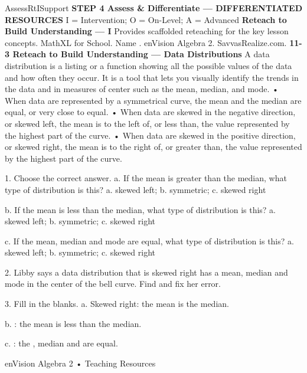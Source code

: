 \documentclass{article}
\newenvironment{te-addendum}[2]{}{}     %
\newcommand{\answer}[1]{}               %
\newcommand{\placeholder}[2]{}          %
\begin{document}
\begin{te-addendum}{Assess}{RtISupport}
\textbf{STEP 4 Assess & Differentiate — DIFFERENTIATED RESOURCES}
I = Intervention; O = On-Level; A = Advanced
\textbf{Reteach to Build Understanding — I}
Provides scaffolded reteaching for the key lesson concepts.
MathXL for School. Name \underline{\hspace{2cm}}. enVision Algebra 2. SavvasRealize.com.
\textbf{11-3 Reteach to Build Understanding — Data Distributions}
A data distribution is a listing or a function showing all the possible values of the data and how often they occur. It is a tool that lets you visually identify the trends in the data and in measures of center such as the mean, median, and mode.
• When data are represented by a symmetrical curve, the mean and the median are equal, or very close to equal.
• When data are skewed in the negative direction, or skewed left, the mean is to the left of, or less than, the value represented by the highest part of the curve.
• When data are skewed in the positive direction, or skewed right, the mean is to the right of, or greater than, the value represented by the highest part of the curve.
\placeholder{graph}{Skewed left black distribution with long left tail, vertical Frequency axis without ticks, and dashed mean, median, mode lines in that left-to-right order. Left arrow below: Negative direction. No numeric scale.}
\placeholder{graph}{Symmetric black bell curve; a single central dashed line labeled Mean, Median, Mode. Unscaled axes. Caption: The graph looks the same on both sides.}
\placeholder{graph}{Skewed right black distribution with long right tail, dashed Mode, Median, Mean lines in that left-to-right order. Right arrow below: Positive direction. Unscaled axes.}
1. Choose the correct answer.
a. If the mean is greater than the median, what type of distribution is this?
a. skewed left; b. symmetric; c. skewed right
\answer{c}
b. If the mean is less than the median, what type of distribution is this?
a. skewed left; b. symmetric; c. skewed right
\answer{a}
c. If the mean, median and mode are equal, what type of distribution is this?
a. skewed left; b. symmetric; c. skewed right
\answer{b}
2. Libby says a data distribution that is skewed right has a mean, median and mode in the center of the bell curve. Find and fix her error.
\answer{A symmetric distribution has a mean, median and mode at the center of the bell curve.}
3. Fill in the blanks.
a. Skewed right: the mean is \underline{\hspace{1cm}} the median.
\answer{greater than}
b. \underline{\hspace{1cm}}: the mean is less than the median.
\answer{Skewed left}
c. \underline{\hspace{1cm}}: the \underline{\hspace{1cm}}, median and \underline{\hspace{1cm}} are equal.
\answer{Symmetric; mean; mode}
enVision Algebra 2 • Teaching Resources
\end{te-addendum}
\end{document}
